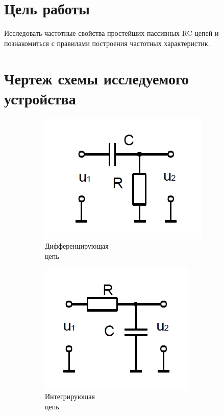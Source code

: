 





\section{Цель работы}
Исследовать частотные свойства простейших пассивных RC­-цепей и познакомиться с правилами построения частотных характеристик.


\section{Чертеж схемы исследуемого устройства}
\begin{figure}[h]
\centering
\begin{subfigure}[b]{0.34\textwidth}
\includegraphics[scale=0.4]{a_scheme.png}
\caption{Дифференцирующая\\ цепь}\label{figure:2.1:a}
\end{subfigure}
\begin{subfigure}[b]{0.3\textwidth}
\includegraphics[scale=0.4]{b_scheme.png}
\caption{Интегрирующая\\ цепь}\label{figure:2.1:b}
\end{subfigure}
\begin{subfigure}[b]{0.3\textwidth}

\end{subfigure}
\end{figure}
